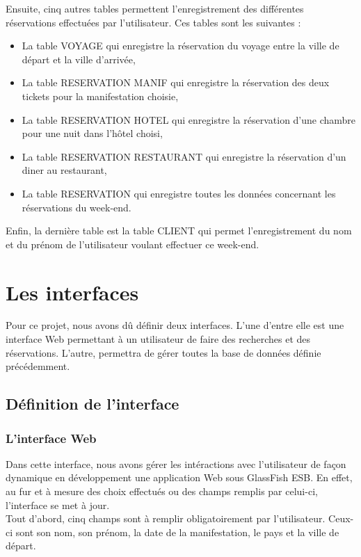 \documentclass[11pt,a4paper]{article}
\begin{document}
Ensuite, cinq autres tables permettent l'enregistrement des différentes
réservations effectuées par l'utilisateur. Ces tables sont les suivantes :\\

\begin{itemize}
  \item La table VOYAGE qui enregistre la réservation du voyage entre la ville
  de départ et la ville d'arrivée,
  \item La table RESERVATION MANIF qui enregistre la réservation des deux tickets
  pour la manifestation choisie,
  \item La table RESERVATION HOTEL qui enregistre la réservation d'une chambre pour
  une nuit dans l'hôtel choisi,
  \item La table RESERVATION RESTAURANT qui enregistre la réservation d'un
  diner au restaurant,
  \item La table RESERVATION qui enregistre toutes les données concernant les
  réservations du week-end.\\
\end{itemize}

Enfin, la dernière table est la table CLIENT qui permet l'enregistrement du nom
et du prénom de l'utilisateur voulant effectuer ce week-end.

\section{Les interfaces}
Pour ce projet, nous avons dû définir deux interfaces. L'une d'entre elle est
une interface Web permettant à un utilisateur de faire des recherches et des
réservations. L'autre, permettra de gérer toutes la base de données définie
précédemment.

\subsection{Définition de l'interface}
\subsubsection{L'interface Web}
Dans cette interface, nous avons gérer les intéractions avec l'utilisateur de
façon dynamique en développement une application Web sous GlassFish ESB. En
effet, au fur et à mesure des choix effectués ou des champs remplis par
celui-ci, l'interface se met à jour.\\


Tout d'abord, cinq champs sont à remplir obligatoirement par l'utilisateur.
Ceux-ci sont son nom, son prénom, la date de la manifestation, le pays et la
ville de départ. 
\end{document}
